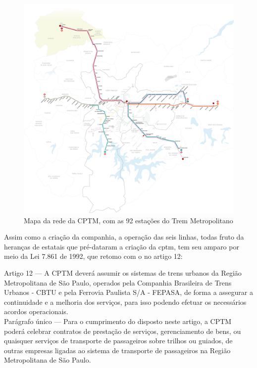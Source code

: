 	\begin{figure}[h]
			\caption{Mapa da rede da CPTM, com as 92 estações do Trem Metropolitano \cite{sitecptm2}}
			\includegraphics[keepaspectratio,width=\textwidth]{img_cptm_linhas.jpg}
	\end{figure}
	
	Assim como a criação da companhia, a operação das seis linhas, todas fruto da heranças de estatais que pré-dataram a criação da {\glsdesc*{cptm}}, tem seu amparo por meio da Lei 7.861 de 1992, que retomo com o no artigo 12:
	
	\begin{citacao}
		Artigo 12 --- A CPTM deverá assumir os sistemas de trens urbanos da Região Metropolitana de São Paulo, operados pela Companhia Brasileira de Trens Urbanos - CBTU e pela Ferrovia Paulista S/A - FEPASA, de forma a assegurar a continuidade e a melhoria dos serviços, para isso podendo efetuar os necessários acordos operacionais.\\
		Parágrafo único --- Para o cumprimento do disposto neste artigo, a CPTM poderá celebrar contratos de prestação de serviços, gerenciamento de bens, ou quaisquer serviços de transporte de passageiros sobre trilhos ou guiados, de outras empresas ligadas ao sistema de transporte de passageiros na Região Metropolitana de São Paulo.\cite{lei7861}
	\end{citacao}

